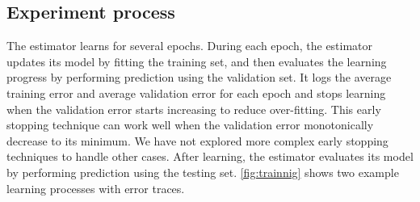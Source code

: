\documentclass{article}
\begin{document}
\subsection{Experiment process}
The estimator learns for several epochs.
During each epoch, the estimator updates its model by fitting the training set, 
and then evaluates the learning progress by performing prediction using the 
validation set.
It logs the average training error and average validation error for each epoch 
and stops learning when the validation error starts increasing to reduce 
over-fitting.
This early stopping technique can work well when the validation error 
monotonically decrease to its minimum.
We have not explored more complex early stopping techniques to handle other 
cases.
After learning, the estimator evaluates its model by performing prediction 
using the testing set.
\autoref{fig:trainnig} shows two example learning processes with error traces.
\end{document}
